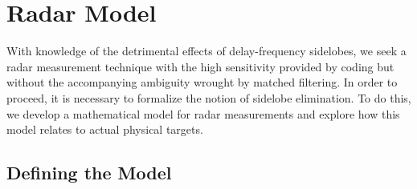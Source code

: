 \chapter{Radar Model}
\label{radar_model}
With knowledge of the detrimental effects of delay-frequency sidelobes, we seek a radar measurement technique with the high sensitivity provided by coding but without the accompanying ambiguity wrought by matched filtering. In order to proceed, it is necessary to formalize the notion of sidelobe elimination. To do this, we develop a mathematical model for radar measurements and explore how this model relates to actual physical targets.

\section{Defining the Model}
\label{radar_model_definition}
